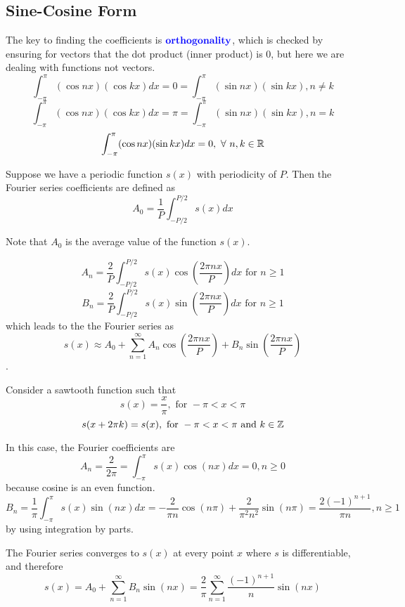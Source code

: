 \documentclass[12pt]{scrartcl}
\begin{document}
\subsection{Sine-Cosine Form}

\begin{note}
    The key to finding the coefficients is  $\textbf{\color{blue} orthogonality}$, which is checked by ensuring for vectors that the dot product (inner product) is 0, but here we are dealing with functions not vectors.
    \[\int_{-\pi}^\pi (\cos nx)(\cos kx) dx = 0 = \int_{-\pi}^\pi (\sin nx)(\sin kx), n \neq k \]
    \[\int_{-\pi}^\pi (\cos nx)(\cos kx) dx = \pi = \int_{-\pi}^\pi (\sin nx)(\sin kx), n = k \]
    \[\int_{-\pi}^\pi (\cos nx)(\sin kx) dx = 0 , \ \forall \ n, k \in \mathbb R\]
\end{note}

\begin{lemma}
    Suppose we have a periodic function $s(x)$ with periodicity of $P$. Then the Fourier series coefficients are defined as
    \[A_0 = \frac{1}{P}\int_{-P/2}^{P/2}s(x) dx\]

    Note that $A_0$ is the average value of the function $s(x)$.

    \[A_n = \frac{2}{P}\int_{-P/2}^{P/2} s(x) \cos(\frac{2\pi nx}{P}) dx \text{ for } n \geq 1\]
    \[B_n = \frac{2}{P}\int_{-P/2}^{P/2} s(x) \sin(\frac{2\pi nx}{P}) dx \text{ for } n \geq 1\]
    which leads to the the Fourier series as
    \[s(x) \approx A_0 + \sum_{n=1}^\infty A_n \cos(\frac{2\pi n x}{P}) + B_n \sin(\frac{2\pi n x}{P})\].
\end{lemma}

\begin{example}
    Consider a sawtooth function such that
    \[s(x) = \frac{x}{\pi}, \text { for } -\pi < x < \pi\]
    \[s(x + 2\pi k) = s(x), \text{ for } -\pi < x < \pi \text{ and } k \in \mathbb Z\]

    In this case, the Fourier coefficients are
    \[A_n = \frac{2}{2\pi} = \int_{-\pi}^\pi s(x) \cos(nx) dx = 0, n \geq 0\] because cosine is an even function.
    \[B_n = \frac{1}{\pi}\int_{-\pi}^\pi s(x) \sin(nx) dx = -\frac{2}{\pi n}\cos(n\pi) + \frac{2}{\pi^2n^2}\sin(n\pi) = \frac{2(-1)^{n+1}}{\pi n}, n \geq 1\]
    by using integration by parts.

    The Fourier series converges to $s(x)$ at every point $x$ where $s$ is
    differentiable, and therefore
    \[s(x) = A_0 + \sum_{n=1}^\infty B_n \sin(nx) = \frac{2}{\pi}\sum_{n=1}^\infty \frac{(-1)^{n+1}}{n}\sin(nx)\]
\end{example}
\end{document}
